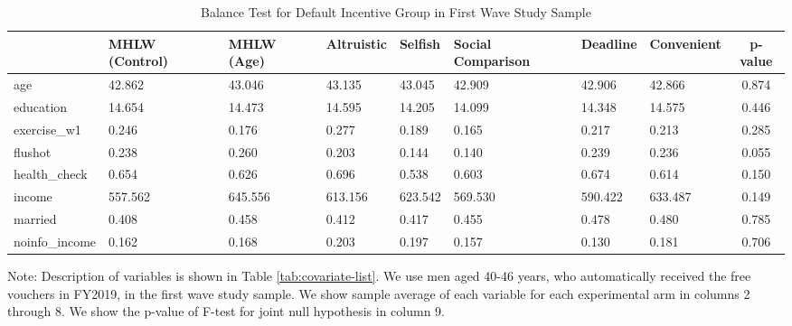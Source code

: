 \begin{table}[!h]

\caption{Balance Test for Default Incentive Group in First Wave Study Sample \label{tab:int-coupon1-balance}}
\centering
\fontsize{9}{11}\selectfont
\begin{threeparttable}
\begin{tabular}[t]{l>{\centering\arraybackslash}p{3em}>{\centering\arraybackslash}p{3em}>{\centering\arraybackslash}p{3em}>{\centering\arraybackslash}p{3em}>{\centering\arraybackslash}p{3em}>{\centering\arraybackslash}p{3em}>{\centering\arraybackslash}p{3em}c}
\toprule
  & MHLW (Control) & MHLW (Age) & Altruistic & Selfish & Social Comparison & Deadline & Convenient & p-value\\
\midrule
age & \num{42.862} & \num{43.046} & \num{43.135} & \num{43.045} & \num{42.909} & \num{42.906} & \num{42.866} & \num{0.874}\\
education & \num{14.654} & \num{14.473} & \num{14.595} & \num{14.205} & \num{14.099} & \num{14.348} & \num{14.575} & \num{0.446}\\
exercise\_w1 & \num{0.246} & \num{0.176} & \num{0.277} & \num{0.189} & \num{0.165} & \num{0.217} & \num{0.213} & \num{0.285}\\
flushot & \num{0.238} & \num{0.260} & \num{0.203} & \num{0.144} & \num{0.140} & \num{0.239} & \num{0.236} & \num{0.055}\\
health\_check & \num{0.654} & \num{0.626} & \num{0.696} & \num{0.538} & \num{0.603} & \num{0.674} & \num{0.614} & \num{0.150}\\
income & \num{557.562} & \num{645.556} & \num{613.156} & \num{623.542} & \num{569.530} & \num{590.422} & \num{633.487} & \num{0.149}\\
married & \num{0.408} & \num{0.458} & \num{0.412} & \num{0.417} & \num{0.455} & \num{0.478} & \num{0.480} & \num{0.785}\\
noinfo\_income & \num{0.162} & \num{0.168} & \num{0.203} & \num{0.197} & \num{0.157} & \num{0.130} & \num{0.181} & \num{0.706}\\
\bottomrule
\end{tabular}
\begin{tablenotes}
\item Note: Description of variables is shown in Table \ref{tab:covariate-list}. We use men aged 40-46 years, who automatically received the free vouchers in FY2019, in the first wave study sample. We show sample average of each variable for each experimental arm in columns 2 through 8. We show the p-value of F-test for joint null hypothesis in column 9.
\end{tablenotes}
\end{threeparttable}
\end{table}
